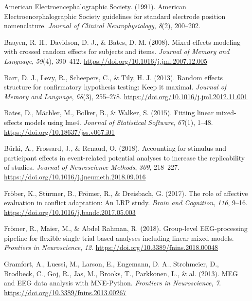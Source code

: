 \documentclass[
  english,
  man,11pt,floatsintext]{apa7}
\newlength{\cslhangindent}
\newenvironment{cslreferences}%
  {\setlength{\parindent}{0pt}%
  \everypar{\setlength{\hangindent}{\cslhangindent}}\ignorespaces}%
  {\par}
\begin{document}
\hypertarget{refs}{}
\begin{cslreferences}
\leavevmode\hypertarget{ref-americanelectroencephalographicsociety1991}{}%
American Electroencephalographic Society. (1991). American Electroencephalographic Society guidelines for standard electrode position nomenclature. \emph{Journal of Clinical Neurophysiology}, \emph{8}(2), 200--202.

\leavevmode\hypertarget{ref-baayen2008}{}%
Baayen, R. H., Davidson, D. J., \& Bates, D. M. (2008). Mixed-effects modeling with crossed random effects for subjects and items. \emph{Journal of Memory and Language}, \emph{59}(4), 390--412. \url{https://doi.org/10.1016/j.jml.2007.12.005}

\leavevmode\hypertarget{ref-barr2013}{}%
Barr, D. J., Levy, R., Scheepers, C., \& Tily, H. J. (2013). Random effects structure for confirmatory hypothesis testing: Keep it maximal. \emph{Journal of Memory and Language}, \emph{68}(3), 255--278. \url{https://doi.org/10.1016/j.jml.2012.11.001}

\leavevmode\hypertarget{ref-R-lme4}{}%
Bates, D., Mächler, M., Bolker, B., \& Walker, S. (2015). Fitting linear mixed-effects models using lme4. \emph{Journal of Statistical Software}, \emph{67}(1), 1--48. \url{https://doi.org/10.18637/jss.v067.i01}

\leavevmode\hypertarget{ref-buxfcrki2018}{}%
Bürki, A., Frossard, J., \& Renaud, O. (2018). Accounting for stimulus and participant effects in event-related potential analyses to increase the replicability of studies. \emph{Journal of Neuroscience Methods}, \emph{309}, 218--227. \url{https://doi.org/10.1016/j.jneumeth.2018.09.016}

\leavevmode\hypertarget{ref-fruxf6ber2017}{}%
Fröber, K., Stürmer, B., Frömer, R., \& Dreisbach, G. (2017). The role of affective evaluation in conflict adaptation: An LRP study. \emph{Brain and Cognition}, \emph{116}, 9--16. \url{https://doi.org/10.1016/j.bandc.2017.05.003}

\leavevmode\hypertarget{ref-fruxf6mer2018}{}%
Frömer, R., Maier, M., \& Abdel Rahman, R. (2018). Group-level EEG-processing pipeline for flexible single trial-based analyses including linear mixed models. \emph{Frontiers in Neuroscience}, \emph{12}. \url{https://doi.org/10.3389/fnins.2018.00048}

\leavevmode\hypertarget{ref-gramfort2013}{}%
Gramfort, A., Luessi, M., Larson, E., Engemann, D. A., Strohmeier, D., Brodbeck, C., Goj, R., Jas, M., Brooks, T., Parkkonen, L., \& al. (2013). MEG and EEG data analysis with MNE-Python. \emph{Frontiers in Neuroscience}, \emph{7}. \url{https://doi.org/10.3389/fnins.2013.00267}


\end{cslreferences}
\end{document}
